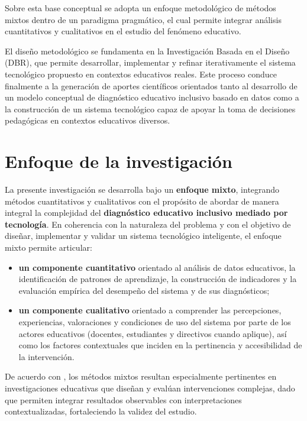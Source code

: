 \begin{refsection}
Sobre esta base conceptual se adopta un enfoque metodológico de métodos mixtos dentro de un paradigma pragmático, el cual permite integrar análisis cuantitativos y cualitativos en el estudio del fenómeno educativo.

El diseño metodológico se fundamenta en la Investigación Basada en el Diseño (DBR), que permite desarrollar, implementar y refinar iterativamente el sistema tecnológico propuesto en contextos educativos reales. Este proceso conduce finalmente a la generación de aportes científicos orientados tanto al desarrollo de un modelo conceptual de diagnóstico educativo inclusivo basado en datos como a la construcción de un sistema tecnológico capaz de apoyar la toma de decisiones pedagógicas en contextos educativos diversos.
\section{Enfoque de la investigación}

La presente investigación se desarrolla bajo un \textbf{enfoque mixto}, integrando métodos cuantitativos y cualitativos con el propósito de abordar de manera integral la complejidad del \textbf{diagnóstico educativo inclusivo mediado por tecnología}. En coherencia con la naturaleza del problema y con el objetivo de diseñar, implementar y validar un sistema tecnológico inteligente, el enfoque mixto permite articular:

\begin{itemize}
\item \textbf{un componente cuantitativo} orientado al análisis de datos educativos, la identificación de patrones de aprendizaje, la construcción de indicadores y la evaluación empírica del desempeño del sistema y de sus diagnósticos;
\item \textbf{un componente cualitativo} orientado a comprender las percepciones, experiencias, valoraciones y condiciones de uso del sistema por parte de los actores educativos (docentes, estudiantes y directivos cuando aplique), así como los factores contextuales que inciden en la pertinencia y accesibilidad de la intervención.
\end{itemize}

De acuerdo con \textcite{creswell2018}, los métodos mixtos resultan especialmente pertinentes en investigaciones educativas que diseñan y evalúan intervenciones complejas, dado que permiten integrar resultados observables con interpretaciones contextualizadas, fortaleciendo la validez del estudio.


\end{refsection}
